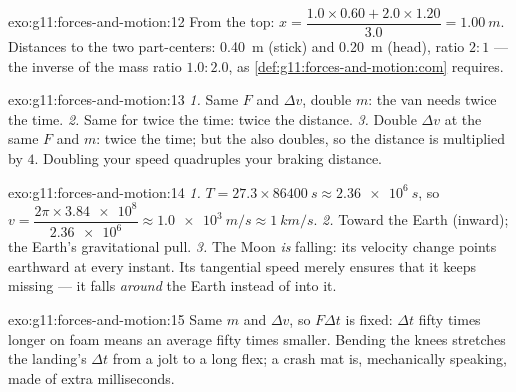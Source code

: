 \begin{solution}{exo:g11:forces-and-motion:12}
From the top: $x = \dfrac{1.0 \times 0.60 + 2.0 \times 1.20}{3.0}
= \qty{1.00}{m}$. Distances to the two part-centers: \qty{0.40}{m}
(stick) and \qty{0.20}{m} (head), ratio $2 : 1$ --- the inverse of the
mass ratio $1.0 : 2.0$, as \cref{def:g11:forces-and-motion:com}
requires.
\end{solution}

\begin{solution}{exo:g11:forces-and-motion:13}
\emph{1.} Same $F$ and $\Delta v$, double $m$: the van needs twice the
time. \emph{2.} Same  for twice the time: twice the
distance. \emph{3.} Double $\Delta v$ at the same $F$ and $m$: twice
the time; but the  also doubles, so the distance is
multiplied by $4$. Doubling your speed quadruples your braking
distance.
\end{solution}

\begin{solution}{exo:g11:forces-and-motion:14}
\emph{1.} $T = 27.3 \times \qty{86400}{s} \approx \qty{2.36e6}{s}$, so
$v = \dfrac{2\pi \times \num{3.84e8}}{\num{2.36e6}} \approx
\qty{1.0e3}{m/s} \approx \qty{1}{km/s}$. \emph{2.} Toward the Earth
(inward); the Earth's gravitational pull. \emph{3.} The Moon \emph{is}
falling: its velocity change points earthward at every instant. Its
tangential speed merely ensures that it keeps missing --- it falls
\emph{around} the Earth instead of into it.
\end{solution}

\begin{solution}{exo:g11:forces-and-motion:15}
Same $m$ and $\Delta v$, so $F\Delta t$ is fixed: $\Delta t$ fifty
times longer on foam means an average  fifty times smaller.
Bending the knees stretches the landing's $\Delta t$ from a jolt to a
long flex; a crash mat is, mechanically speaking, made of extra
milliseconds.
\end{solution}


